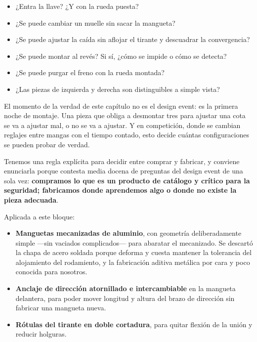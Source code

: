 \begin{itemize}
  \item ¿Entra la llave? ¿Y con la rueda puesta?
  \item ¿Se puede cambiar un muelle sin sacar la mangueta?
  \item ¿Se puede ajustar la caída sin aflojar el tirante y descuadrar la
        convergencia?
  \item ¿Se puede montar al revés? Si sí, ¿cómo se impide o cómo se detecta?
  \item ¿Se puede purgar el freno con la rueda montada?
  \item ¿Las piezas de izquierda y derecha son distinguibles a simple vista?
\end{itemize}

\begin{clave}
El momento de la verdad de este capítulo no es el design event: es la primera
noche de montaje. Una pieza que obliga a desmontar tres para ajustar una cota
se va a ajustar mal, o no se va a ajustar. Y en competición, donde se cambian
reglajes entre mangas con el tiempo contado, esto decide cuántas
configuraciones se pueden probar de verdad.
\end{clave}


\begin{caso}
Tenemos una regla explícita para decidir entre comprar y fabricar, y conviene
enunciarla porque contesta media docena de preguntas del design event de una
sola vez: \textbf{compramos lo que es un producto de catálogo y crítico para la
seguridad; fabricamos donde aprendemos algo o donde no existe la pieza
adecuada}.

Aplicada a este bloque:

\begin{itemize}
  \item \textbf{Manguetas mecanizadas de aluminio}, con geometría
        deliberadamente simple ---sin vaciados complicados--- para abaratar el
        mecanizado. Se descartó la chapa de acero soldada porque deforma y
        cuesta mantener la tolerancia del alojamiento del rodamiento, y la
        fabricación aditiva metálica por cara y poco conocida para nosotros.
  \item \textbf{Anclaje de dirección atornillado e intercambiable} en la
        mangueta delantera, para poder mover longitud y altura del brazo de
        dirección sin fabricar una mangueta nueva.
  \item \textbf{Rótulas del tirante en doble cortadura}, para quitar flexión de
        la unión y reducir holguras.
\end{itemize}

\medskip
{}
\end{caso}


